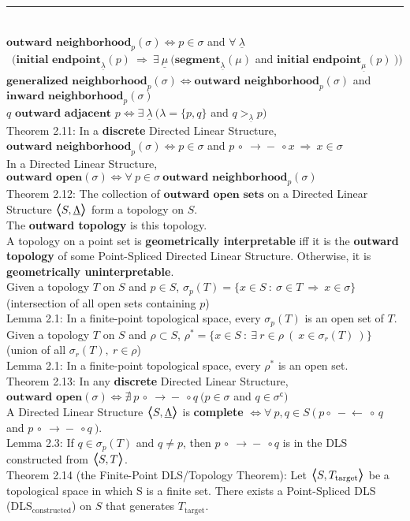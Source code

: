 \documentclass{article}
\newcommand{\hsp}[1][5]{\hspace{0.#1 cm}}
\newcommand{\hcm}[1][1]{\hspace{#1 cm}}
\newcommand{\bra}[1][1.2]{\scalebox{#1}{$\boldsymbol{\langle}$}}
\newcommand{\nl}[1][12]{\\[#1pt]}
\newcommand{\ket}[1][1.2]{\scalebox{#1}{$\boldsymbol{\rangle}$}}
\newcommand{\imp}{\ \Rightarrow\ }
\newcommand{\st}{\ : \ }
\newcommand{\ch}[1]{\text{#1}}
\newcommand {\chb}[1]{\textbf{#1}}
\newcommand{\lseg}{-\!\!\!\leftarrow\!\!}
\newcommand{\rseg}{\!\rightarrow\!\!\!-}
\newcommand{\ladj}{\circ\!\!\!\!\:\lseg\!\!\:\circ\,}
\newcommand{\radj}{\,\circ\!\!\!\:\rseg\!\!\!\!\:\circ}
\newcommand{\ul}[1]{\underline{#1}}
\begin{document}
\begin{flushleft}
\par\noindent\rule{\textwidth}{0.4pt}\nl[8] %

$\chb{outward neighborhood}_p(\sigma) \iff p \in \sigma $ and $\forall\ \ul{\lambda}$\\\hcm\  $\Big(\chb{initial endpoint}_{\ul{\lambda}}(p) \imp \exists\ \ul{\mu}\ \big(\chb{segment}_{\ul{\lambda}}(\mu)$ and $\chb{initial endpoint}_{\ul{\mu}}(p)\ \big)\Big)$\nl[5]

\hsp[2] $\chb{generalized neighborhood}_p(\sigma) \iff \chb{outward neighborhood}_p(\sigma)$ and $\chb{inward neighborhood}_p(\sigma)$\nl[10]

$q \chb{ outward adjacent } p \iff \exists\ \ul{\lambda}\ \Big(\lambda = \{p,q\}$ and $q>_{\ul{\lambda}}p\Big)$\nl[5]
\hcm Theorem 2.11: In a \chb{discrete} Directed Linear Structure, $\chb{outward neighborhood}_p(\sigma) \iff p \in \sigma $ and $p \radj x \imp x \in \sigma$\nl[10]

In a Directed Linear Structure, $\chb{outward open}(\sigma) \iff \forall\ p\in \sigma\ \chb{outward neighborhood}_p(\sigma) $\nl[5]
\hcm Theorem 2.12: The collection of $\chb{outward open sets}$ on a Directed Linear Structure $\bra S, \ul{\Lambda}\ket$ form a topology on $S$.\nl[5]
\hsp[2] The \chb{outward topology} is this topology.\nl[10]

A topology on a point set is \chb{geometrically interpretable} iff it is the \chb{outward topology} of some Point-Spliced Directed Linear Structure. Otherwise, it is \chb{geometrically uninterpretable}.\nl[10]

Given a topology $T$ on $S$ and $p\in S$, {\color{purple} $\sigma_p(T) = \{x\in S \st \sigma \in T \imp x \in \sigma\}$} (intersection of all open sets containing $p$)\nl[10]

\hcm Lemma 2.1: In a finite-point topological space, every $\sigma_p(T)$ is an open set of $T$.\nl[10]

Given a topology $T$ on $S$ and $\rho \subset S$, {\color{purple} $\rho^* = \{x \in S \st \exists\ r \in \rho \ (\ x \in \sigma_r(T)\ )\}$} (union of all $\sigma_r(T),\ r\in \rho$)\nl[5]

\hcm Lemma 2.1: In a finite-point topological space, every $\rho^*$ is an open set.\nl[10]

Theorem 2.13: In any \chb{discrete} Directed Linear Structure,\\\hcm $\chb{outward open}(\sigma) \iff \nexists\ p\radj q\ \Big(p \in \sigma $ and $q \in \sigma^\mathsf{c}\Big)$\nl[10]

A Directed Linear Structure $\bra S, \ul{\Lambda}\ket$ is \chb{complete} $\iff \forall\ p,q\in S\ \big(\ p\ladj q$ and $p \radj q\ \big)$.\nl[10]

\hcm Lemma 2.3: If $q \in \sigma_p(T)$ and $q \neq p$, then $p\radj q$ is in the DLS constructed from $\bra S, T\ket$.\nl[10]

\hcm Theorem 2.14 (the Finite-Point DLS/Topology Theorem): Let $\bra S, T_\ch{target}\ket$ be a topological space in which S is a finite set. There exists a Point-Spliced DLS (DLS$_\ch{constructed}$) on $S$ that generates $T_\ch{target}$.

\end{flushleft}
\end{document}
